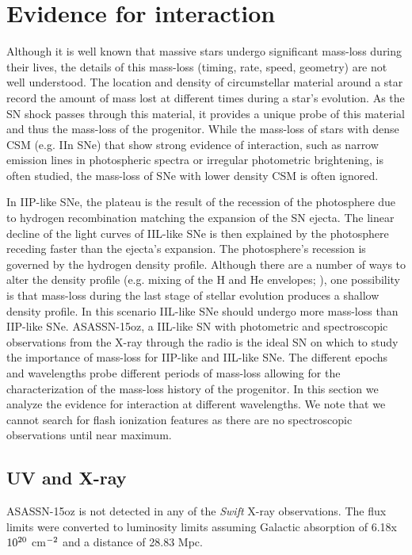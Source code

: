 \documentclass[a4paper,fleqn,usenatbib]{mnras}
\begin{document}
\section{Evidence for interaction} \label{sec:Interaction}
Although it is well known that massive stars undergo significant mass-loss during their lives, the details of this mass-loss (timing, rate, speed, geometry) are not well understood.
The location and density of circumstellar material around a star record the amount of mass lost at different times during a star's evolution. 
As the SN shock passes through this material, it provides a unique probe of this material and thus the mass-loss of the progenitor.
While the mass-loss of stars with dense CSM (e.g. IIn SNe) that show strong evidence of interaction, such as narrow emission lines in photospheric spectra or irregular photometric brightening, is often studied, the mass-loss of SNe with lower density CSM is often ignored.

In IIP-like SNe, the plateau is the result of the recession of the photosphere due to hydrogen recombination matching the expansion of the SN ejecta. 
The linear decline of the light curves of IIL-like SNe is then explained by the photosphere receding faster than the ejecta's expansion. 
The photosphere's recession is governed by the hydrogen density profile. 
Although there are a number of ways to alter the density profile (e.g. mixing of the H and He envelopes; \citealt{2017utrobin}), one possibility is that mass-loss during the last stage of stellar evolution produces a shallow density profile. 
In this scenario IIL-like SNe should undergo more mass-loss than IIP-like SNe. 
ASASSN-15oz, a IIL-like SN with photometric and spectroscopic observations from the X-ray through the radio is the ideal SN on which to study the importance of mass-loss for IIP-like and IIL-like SNe.
The different epochs and wavelengths probe different periods of mass-loss allowing for the characterization of the mass-loss history of the progenitor.
In this section we analyze the evidence for interaction at different wavelengths.
We note that we cannot search for flash ionization features as there are no spectroscopic observations until near maximum.
\subsection{UV and X-ray}
ASASSN-15oz is not detected in any of the \textit{Swift} X-ray observations. 
The flux limits were converted to luminosity limits assuming Galactic absorption of 6.18x$\rm{10^{20}}$ cm$\rm{^{-2}}$ \citep{2005kalberla} and a distance of 28.83 Mpc.
\end{document}
